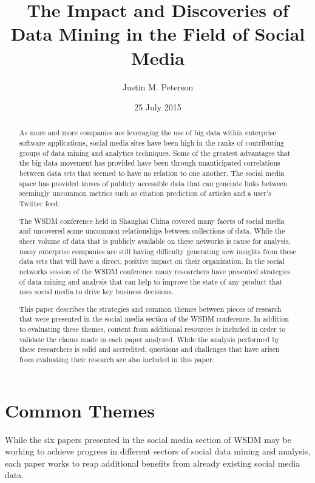 \documentclass{sig-alternate}
\begin{document}
\title{The Impact and Discoveries of Data Mining in the Field of
Social Media}
\author{
\alignauthor
Justin M. Peterson
}
\date{25 July 2015}
\maketitle
\begin{abstract}
As more and more companies are leveraging the use of big data within
enterprise software applications, social media sites have been high in the 
ranks of contributing groups of data mining and analytics techniques. Some of the
greatest advantages that the big data movement has provided have been through
unanticipated correlations between data sets that seemed to have no relation
to one another. The social media space has provided troves of publicly accessible 
data that can generate links between seemingly uncommon metrics such as citation prediction
of articles and a user's Twitter feed. 

The WSDM conference held in Shanghai China
covered many facets of social media and uncovered some uncommon 
relationships between collections of data. While the sheer volume
of data that is publicly available on these networks is cause for analysis, many enterprise
companies are still having difficulty generating new insights from these data sets that
will have a direct, positive impact on their organization. In the social networks session
of the WSDM conference many researchers have presented strategies of data mining and analysis 
that can help to improve the state of any product that uses social media to drive key business 
decisions. 

This paper describes the strategies and common themes between pieces of research that were presented
in the social media section of the WSDM conference. In addition to evaluating these themes, content from additional
resources is included in order to validate the claims made in each paper analyzed. While the analysis 
performed by these researchers is solid and accredited, questions and challenges that have arisen from 
evaluating their research are also included in this paper.
\end{abstract}

\section{Common Themes}
\label{common themes}
While the six papers presented in the social media section of WSDM \cite{DBLP:conf/wsdm/2015} may be working to achieve progress in
different sectors of social data mining and analysis, each paper works to reap additional 
benefits from already existing social media data. 
\end{document}
